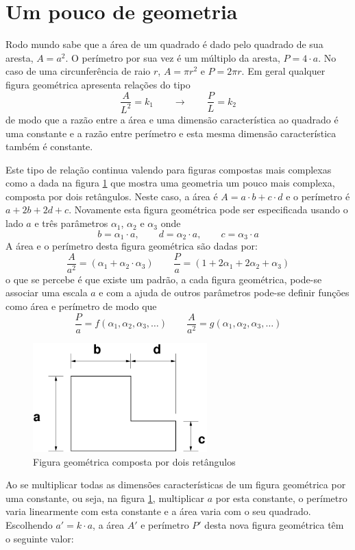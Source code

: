 \documentclass[article,12pt,oneside,a4paper,english,brazil,sumario=tradicional]{abntex2}
\newcommand{\lra}{\ensuremath{\longrightarrow}}
\newcommand{\qqrq}{\ensuremath{\qquad\lra\qquad}}
\begin{document}
\section{Um pouco de geometria}
Rodo mundo sabe que a área de um quadrado é dado pelo quadrado de sua aresta, $A=a^2$. O perímetro por sua vez é um múltiplo da aresta, $P = 4\cdot a$. No caso de uma circunferência de raio $r$, $A = \pi r^2$ e $P = 2\pi r$. Em geral qualquer figura geométrica apresenta relações do tipo 
\[
\frac{A}{L^2} = k_1 \qqrq \frac{P}{L} = k_2
\]
de modo que a razão entre a área e uma dimensão característica ao quadrado é uma constante e a razão entre perímetro e esta mesma dimensão característica também é constante. 

Este tipo de relação continua valendo para figuras compostas mais complexas como a dada na figura \ref{fig:L2d} que mostra uma geometria um pouco mais complexa, composta por dois retângulos. Neste caso, a área é $A = a\cdot b + c\cdot d$ e o perímetro é $a + 2b + 2d + c$. Novamente esta figura geométrica pode ser especificada usando o lado $a$ e três parâmetros $\alpha_1$, $\alpha_2$ e $\alpha_3$ onde
\[
b = \alpha_1\cdot a, \qquad d = \alpha_2\cdot a, \qquad c = \alpha_3\cdot a
\]
A área e o perímetro desta figura geométrica são dadas por:
\[
\frac{A}{a^2} = (\alpha_1 + \alpha_2\cdot\alpha_3) \qquad \frac{P}{a} = (1 + 2\alpha_1+2\alpha_2+\alpha_3)
\]
o que se percebe é que existe um padrão, a cada figura geométrica, pode-se associar uma escala $a$ e com a ajuda de outros parâmetros pode-se definir funções como área e perímetro de modo que 
\[
\frac{P}{a} = f(\alpha_1, \alpha_2, \alpha_3, \ldots) \qquad \frac{A}{a^2} = g(\alpha_1, \alpha_2, \alpha_3, \ldots)
\]

\begin{figure}
\centering
\includegraphics[width=0.6\textwidth]{./figuras/L2d.pdf}
\caption{Figura geométrica composta por dois retângulos}
\label{fig:L2d}
\end{figure}

Ao se multiplicar todas as dimensões características de um figura geométrica por uma constante, ou seja, na figura \ref{fig:L2d}, multiplicar $a$ por esta constante, o perímetro varia linearmente com esta constante e a área varia com o seu quadrado. Escolhendo $a'=k\cdot a$, a área $A'$ e perímetro $P'$ desta nova figura geométrica têm o seguinte valor:
\end{document}
